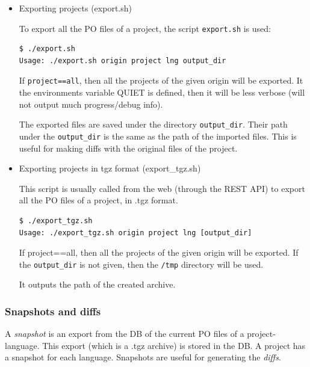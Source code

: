 \documentclass[11pt]{article}
\begin{document}
\begin{itemize}
\item Exporting projects (export.sh)\\
\label{sec-8.4.3.2}


     To export all the PO files of a project, the script \texttt{export.sh} is
     used:

\begin{verbatim}
$ ./export.sh
Usage: ./export.sh origin project lng output_dir
\end{verbatim}



     If \texttt{project==all}, then all the projects of the given origin will be
     exported. It the environments variable QUIET is defined, then it
     will be less verbose (will not output much progress/debug info).

     The exported files are saved under the directory \texttt{output\_dir}.
     Their path under the \texttt{output\_dir} is the same as the path of the
     imported files. This is useful for making diffs with the original
     files of the project.
    

\item Exporting projects in tgz format (export\_{}tgz.sh)\\
\label{sec-8.4.3.3}


     This script is usually called from the web (through the REST API)
     to export all the PO files of a project, in .tgz format.

\begin{verbatim}
$ ./export_tgz.sh
Usage: ./export_tgz.sh origin project lng [output_dir]
\end{verbatim}



     If project==all, then all the projects of the given origin will be
     exported. If the \texttt{output\_dir} is not given, then the \texttt{/tmp}
     directory will be used.

     It outputs the path of the created archive.


\end{itemize} %
\subsubsection{Snapshots and diffs}
\label{sec-8.4.4}


    A \emph{snapshot} is an export from the DB of the current PO files of a
    project-language. This export (which is a .tgz archive) is stored in
    the DB. A project has a snapshot for each language. Snapshots are
    useful for generating the \emph{diffs}.
\end{document}
